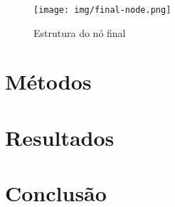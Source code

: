 \documentclass[a4paper]{article}
\begin{document}
\begin{figure}[ht]
\centering
\texttt{[image: img/final-node.png]}
\caption{Estrutura do nó final}
\label{fig:final-node}
\end{figure}

\section{Métodos}\label{metodos}


\section{Resultados}\label{resultados}


\section{Conclusão}\label{conclusao}




\end{document}

